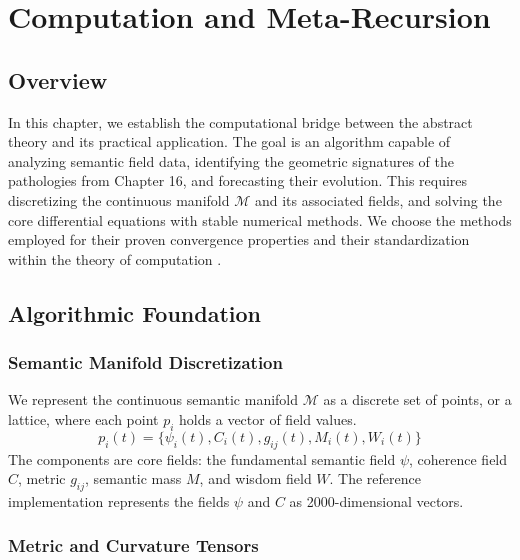\chapter{Computation and Meta-Recursion}

\section{Overview}

In this chapter, we establish the computational bridge between the abstract theory and its practical application. The goal is an algorithm capable of analyzing semantic field data, identifying the geometric signatures of the pathologies from Chapter 16, and forecasting their evolution. This requires discretizing the continuous manifold \(\mathcal{M}\) and its associated fields, and solving the core differential equations with stable numerical methods. We choose the methods employed for their proven convergence properties and their standardization within the theory of computation \autocite{Sipser2012}.

\section{Algorithmic Foundation}

\subsection{Semantic Manifold Discretization}

We represent the continuous semantic manifold \(\mathcal{M}\) as a discrete set of points, or a lattice, where each point \(p_i\) holds a vector of field values.
\begin{equation}
p_i(t) = \{\psi_i(t), C_i(t), g_{ij}(t), M_i(t), W_i(t)\}
\end{equation}
The components are core fields: the fundamental semantic field \(\psi\), coherence field \(C\), metric \(g_{ij}\), semantic mass \(M\), and wisdom field \(W\). The reference implementation represents the fields \(\psi\) and \(C\) as 2000-dimensional vectors.

\subsection{Metric and Curvature Tensors}


